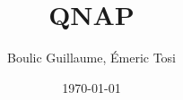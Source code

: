 \documentclass[a4paper,12pt]{report}
\title{QNAP}
\author{Boulic Guillaume, Émeric Tosi}
\date{\today}
\begin{document}
%
    \maketitle{}
%
    \setcounter{tocdepth}{1} %
    \renewcommand{\contentsname}{Sommaire} %
    \tableofcontents{} %
%
    \clearpage
%
%
%
%

\clearpage
%
%

\clearpage
%
%

\clearpage
%
%
%
\end{document}
